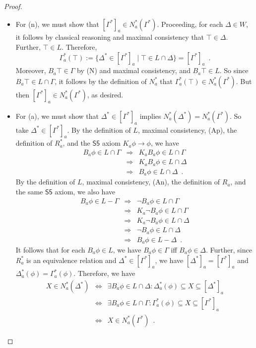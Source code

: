 \documentclass[12pt]{article}
\theoremstyle{definition}
\begin{document}
\begin{proof}
\begin{itemize}
  \item For (n), we must show that $[\Gamma^*]_a\in N^*_a(\Gamma^*)$.
    Proceeding, for each $\Delta\in W$, it follows by classical
    reasoning and maximal consistency that $\top\in\Delta$.  Further,
    $\top\in L$.  Therefore,
    \[
    \Gamma^*_a(\top):= \{\Delta^*\in[\Gamma^*]_a\mid \top\in
    L\cap\Delta\}=[\Gamma^*]_a\enspace.
    \]
    Moreover, $B_a\top\in\Gamma$ by (N) and maximal consistency, and
    $B_a\top\in L$.  So since $B_a\top\in L\cap\Gamma$, it follows by
    the definition of $N^*_a$ that $\Gamma^*_a(\top)\in
    N^*_a(\Gamma^*)$.  But then $[\Gamma^*]_a\in N^*_a(\Gamma^*)$, as
    desired.

  \item For (a), we must show that $\Delta^*\in[\Gamma^*]_a$ implies
    $N^*_a(\Delta^*)=N^*_a(\Gamma^*)$.  So take
    $\Delta^*\in[\Gamma^*]_a$. By the definition of $L$, maximal
    consistency, (Ap), the definition of $R^*_a$, and the
    $\mathsf{S5}$ axiom $K_a\phi\to\phi$, we have
    \[
    \renewcommand{\arraystretch}{1.3}
    \begin{array}{lcl}
      B_a\phi\in L\cap\Gamma 
      & \Rightarrow &
      K_aB_a\phi\in L\cap \Gamma
      \\
      & \Rightarrow &
      K_aB_a\phi\in L\cap\Delta
      \\
      & \Rightarrow &
      B_a\phi\in L\cap\Delta\enspace.
    \end{array}
    \]
    By the definition of $L$, maximal consistency, (An), the
    definition of $R_a$, and the same $\mathsf{S5}$ axiom, we also
    have
    \[
    \renewcommand{\arraystretch}{1.3}
    \begin{array}{lcl}
      B_a\phi\in L-\Gamma 
      & \Rightarrow &
      \lnot B_a\phi\in L\cap\Gamma
      \\
      & \Rightarrow &
      K_a\lnot B_a\phi\in L\cap \Gamma
      \\
      & \Rightarrow &
      K_a\lnot B_a\phi\in L\cap\Delta
      \\
      & \Rightarrow &
      \lnot B_a\phi\in L\cap\Delta
      \\
      & \Rightarrow &
      B_a\phi\in L-\Delta
      \enspace.
    \end{array}
    \]
    It follows that for each $B_a\phi\in L$, we have
    $B_a\phi\in\Gamma$ iff $B_a\phi\in\Delta$.  Further, since $R^*_a$
    is an equivalence relation and $\Delta^*\in[\Gamma^*]_a$, we have
    $[\Delta^*]_a=[\Gamma^*]_a$ and
    $\Delta^*_a(\phi)=\Gamma^*_a(\phi)$.  Therefore, we have
    \[
    \renewcommand{\arraystretch}{1.3}
    \begin{array}{lcl}
      X\in N^*_a(\Delta^*)
      & \Leftrightarrow &
      \exists B_a\phi\in L\cap\Delta:
      \Delta^*_a(\phi)\subseteq X\subseteq[\Delta^*]_a
      \\
      & \Leftrightarrow &
      \exists B_a\phi\in L\cap\Gamma:
      \Gamma^*_a(\phi)\subseteq X\subseteq[\Gamma^*]_a
      \\
      & \Leftrightarrow &
      X\in N^*_a(\Gamma^*)
      \enspace.
    \end{array}          
    \]


\end{itemize}
\end{proof}
\end{document}
